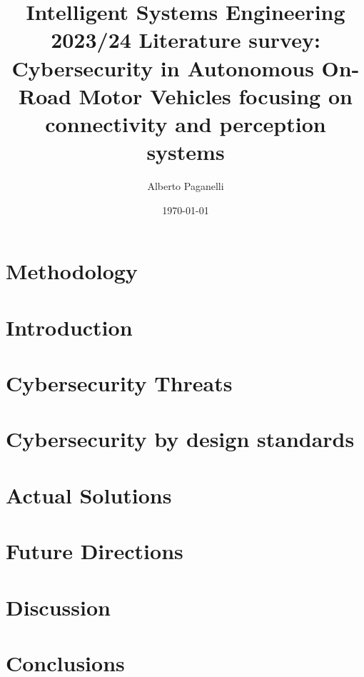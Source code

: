 \documentclass{scrartcl}
\title{\LARGE
Intelligent Systems Engineering 2023/24 \newline
\newline
Literature survey: \\
Cybersecurity in Autonomous On-Road Motor Vehicles focusing on connectivity and perception systems
}
\author{
    Alberto Paganelli \\ \emailaddr{alberto.paganelli3@studio.unibo.it}
}
\date{\today}
\begin{document}
    \maketitle
    \begin{abstract}
    
    \end{abstract}

    \newpage
    \tableofcontents
    \newpage

    \section{Methodology}\label{sec:methodology}
    

    \section{Introduction}\label{sec:introduction}
    

    \section{Cybersecurity Threats}\label{sec:cybersecurity-threats}
    

    \section{Cybersecurity by design standards}\label{sec:cybersecurity-by-design-standards}
    

    \section{Actual Solutions}\label{sec:actual-solutions}
    

    \section{Future Directions}\label{sec:future-directions}
    

    \section{Discussion}\label{sec:discussion}
    

    \section{Conclusions}\label{sec:conclusions}
    

    ~\nocite{*}
    
    
\end{document}
